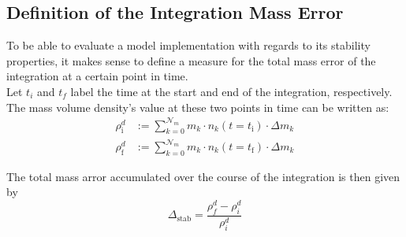     \subsection{Definition of the Integration Mass Error}

        To be able to evaluate a model implementation with regards to its stability properties,
        it makes sense to define a measure for the total mass error of the integration at 
        a certain point in time. \\

        Let $t_i$ and $t_f$ label the time at the start and end of the integration, respectively.
        The mass volume density's value at these two points in time can be written as:
        \begin{align}
            \rho_\text{i}^d
                &:=\sum_{k=0}^{\mathcal N_m} m_k\cdot n_k(t=t_\text{i})\cdot\Delta m_k
            \\
            \rho_\text{f}^d
                &:=\sum_{k=0}^{\mathcal N_m} m_k\cdot n_k(t=t_\text{f})\cdot\Delta m_k
        \end{align}

        The total mass arror accumulated over the course of the integration is then given by
        \begin{equation}
            \Delta_\text{stab} =\frac{\rho_f^d - \rho_i^d}{\rho_i^d}
        \end{equation}



